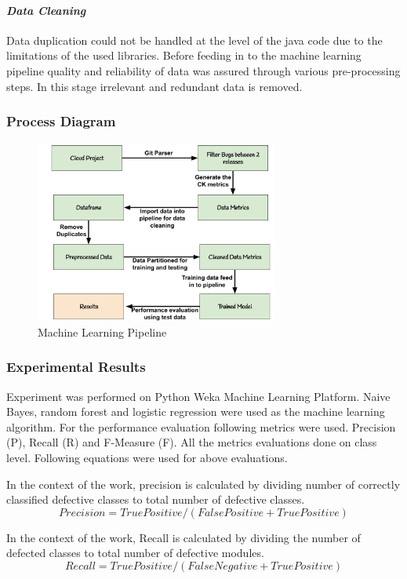 \documentclass{seal_article}
\begin{document}
\paragraph{\textit{Data Cleaning}}
Data duplication could not be handled at the level of the java code due to the limitations of the used libraries. Before feeding in to the machine learning pipeline quality and reliability of data was assured through various pre-processing steps. In this stage irrelevant and redundant data is removed. 

\subsubsection{Process Diagram}
\vspace{\baselineskip}
\begin{figure}[htp]
    \centering
    \includegraphics[width=8cm]{Process.png}
    \caption{Machine Learning Pipeline}
    \label{fig:Initial Bug }
\end{figure}

\subsubsection{Experimental Results}
Experiment was performed on Python Weka Machine Learning Platform. Naive Bayes, random forest and logistic regression were used as the machine learning algorithm. For the performance evaluation following metrics were used. Precision (P), Recall (R) and F-Measure (F).
All the metrics evaluations done on class level. Following equations were used for above evaluations.

In the context of the work, precision is calculated by dividing number of correctly classified defective classes to total number of defective classes.
\[ Precision = True Positive /(False Positive + True Positive)  \]

In the context of the work, Recall is calculated by dividing the number of defected classes to total number of defective modules.
\[ Recall = True Positive /(False Negative + True Positive) \]
\end{document}

